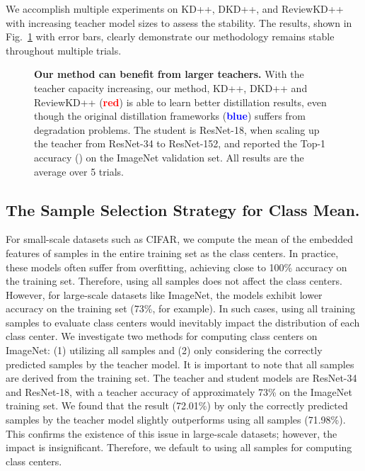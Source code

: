 \documentclass{article}
\begin{document}
We accomplish multiple experiments on KD++, DKD++, and ReviewKD++ with increasing teacher model sizes to assess the stability. The results, shown in Fig.~\ref{fig:suppl_err_bar} with error bars, clearly demonstrate our methodology remains stable throughout multiple trials.
\begin{figure}[h]
\centering

\caption{\small
\textbf{Our method can benefit from larger teachers.} With the teacher capacity increasing, our method, KD++, DKD++ and ReviewKD++ (\textcolor{red}{\textbf{red}}) is able to learn better distillation results, even though the original distillation frameworks (\textcolor{blue}{\textbf{blue}}) suffers from degradation problems. The student is ResNet-18, when scaling up the teacher from ResNet-34 to ResNet-152, and reported the Top-1 accuracy () on the ImageNet validation set. All results are the average over 5 trials.
}
\vspace{-2.0mm}
\label{fig:suppl_err_bar}
\end{figure} \subsection{The Sample Selection Strategy for Class Mean.}


For small-scale datasets such as CIFAR, we compute the mean of the embedded features of samples in the entire training set as the class centers. In practice, these models often suffer from overfitting, achieving close to 100\% accuracy on the training set. Therefore, using all samples does not affect the class centers. However, for large-scale datasets like ImageNet, the models exhibit lower accuracy on the training set (73\%, for example). In such cases, using all training samples to evaluate class centers would inevitably impact the distribution of each class center. We investigate two methods for computing class centers on ImageNet: (1) utilizing all samples and (2) only considering the correctly predicted samples by the teacher model. It is important to note that all samples are derived from the training set. The teacher and student models are ResNet-34 and ResNet-18, with a teacher accuracy of approximately 73\% on the ImageNet training set. We found that the result (72.01\%) by only the correctly predicted samples by the teacher model slightly outperforms using all samples (71.98\%). This confirms the existence of this issue in large-scale datasets; however, the impact is insignificant. Therefore, we default to using all samples for computing class centers.

 
\end{document}
